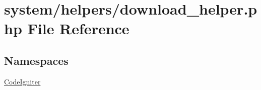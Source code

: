 \hypertarget{download__helper_8php}{}\section{system/helpers/download\+\_\+helper.php File Reference}
\label{download__helper_8php}
\subsection*{Namespaces}
\begin{DoxyCompactItemize}
\item 
 \mbox{\hyperlink{namespace_code_igniter}{Code\+Igniter}}
\end{DoxyCompactItemize}
